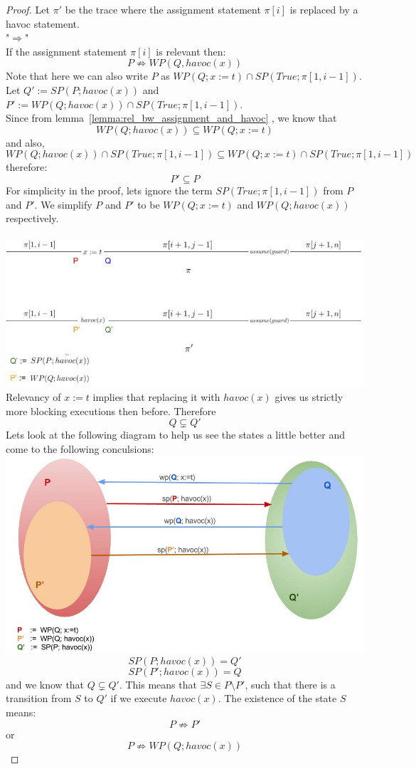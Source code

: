 \documentclass{article}
\newcommand{\limp}{\Rightarrow}
\begin{document}
\begin{proof}
Let $\pi'$ be the trace where the assignment statement $\pi[i]$ is replaced by a havoc statement. \\
"$\Rightarrow$" \\
If the assignment statement $\pi[i]$ is relevant then:
$$P \not \limp WP(Q,havoc(x))$$
Note that here we can also write $P$ as $WP(Q; x:=t) \cap SP(True; \pi[1, i-1])$.\\
Let $Q' := SP(P; havoc(x))$ and $P' := WP(Q;havoc(x)) \cap SP(True; \pi[1, i-1])$. \\
Since from lemma~\ref{lemma:rel_bw_assignment_and_havoc} , we know that 
$$WP(Q; havoc(x)) \subseteq WP(Q; x:=t)$$
and also,
$$WP(Q; havoc(x)) \cap SP(True; \pi[1, i-1])  \subseteq WP(Q; x:=t) \cap SP(True; \pi[1, i-1])$$
therefore:
$$P' \subseteq P$$
For simplicity in the proof, lets ignore the term $SP(True; \pi[1, i-1])$ from $P$ and $P'$. We simplify $P$ and $P'$ to be $WP(Q; x:=t)$ and $WP(Q; havoc(x))$ respectively. \\
\\
\includegraphics[width=\linewidth]{traces.jpg}\\
Relevancy of $x:=t$ implies that replacing it with $havoc(x)$ gives us strictly more blocking executions then before. Therefore
$$Q \subsetneq Q'$$
\newpage
Lets look at the following diagram to help us see the states a little better and come to the following conculsions:\\
\includegraphics[width=\linewidth]{states.jpg}\\
$$SP(P; havoc(x)) = Q'$$
$$SP(P'; havoc(x)) = Q$$
and we know that $Q \subsetneq Q'$. This means that $\exists S \in P \setminus P'$, such that there is a transition from $S$ to $Q'$ if we execute $havoc(x)$. The existence of the state $S$ means:
$$P \not \limp P'$$
or
$$P \not \limp WP(Q; havoc(x))$$
\end{proof}
\end{document}
